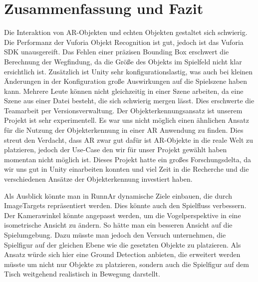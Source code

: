\chapter{Zusammenfassung und Fazit}

Die Interaktion von AR-Objekten und echten Objekten gestaltet sich schwierig. Die Performanz der Vuforia Objekt Recognition ist gut, jedoch ist das Vuforia SDK unausgereift. Das Fehlen einer präzisen Bounding Box erschwert die Berechnung der Wegfindung, da die Größe des Objekts im Spielfeld nicht klar ersichtlich ist. Zusätzlich ist Unity sehr konfigurationslastig, was auch bei kleinen Änderungen in der Konfiguration große Auswirkungen auf die Spielszene haben kann.  Mehrere Leute können nicht gleichzeitig in einer Szene arbeiten, da eine Szene aus einer Datei besteht, die sich schwierig mergen lässt. Dies erschwerte die Teamarbeit per Versionsverwaltung. Der Objekterkennungsansatz ist unserem Projekt ist sehr experimentell. Es war uns nicht möglich einen ähnlichen Ansatz für die Nutzung der Objekterkennung in einer AR Anwendung zu finden. Dies streut den Verdacht, dass AR zwar gut dafür ist AR-Objekte in die reale Welt zu platzieren, jedoch der Use-Case den wir für unser Projekt gewählt haben momentan nicht möglich ist. Dieses Projekt hatte ein großes Forschungsdelta, da wir uns gut in Unity einarbeiten konnten und viel Zeit in die Recherche und die verschiedenen Ansätze der Objekterkennung investiert haben. 


Als Ausblick könnte man in RunnAr dynamische Ziele einbauen, die durch ImageTargets repräsentiert werden. Dies könnte auch den Spielfluss verbessern. Der Kamerawinkel könnte angepasst werden, um die Vogelperspektive in eine isometrische Ansicht zu ändern. So hätte man ein besseren Ansicht auf die Spielumgebung. Dazu müsste man jedoch den Versuch unternehmen, die Spielfigur auf der gleichen Ebene wie die gesetzten Objekte zu platzieren. Als Ansatz würde sich hier eine Ground Detection anbieten, die erweitert werden müsste um nicht nur Objekte zu platzieren, sondern auch die Spielfigur auf dem Tisch weitgehend realistisch in Bewegung darstellt.